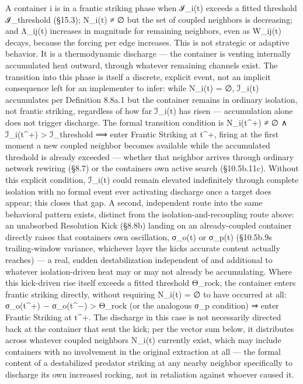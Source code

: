 \documentclass[
]{article}
\begin{document}
A container i is in a frantic striking phase when ℐ\_i(t) exceeds a
fitted threshold ℐ\_threshold (§15.3); N\_i(t) ≠ ∅ but the set of
coupled neighbors is decreasing; and Λ\_ij(t) increases in magnitude for
remaining neighbors, even as W\_ij(t) decays, because the forcing per
edge increases. This is not strategic or adaptive behavior. It is a
thermodynamic discharge --- the container is venting internally
accumulated heat outward, through whatever remaining channels exist. The
transition into this phase is itself a discrete, explicit event, not an
implicit consequence left for an implementer to infer: while N\_i(t) =
∅, ℐ\_i(t) accumulates per Definition 8.8a.1 but the container remains
in ordinary isolation, not frantic striking, regardless of how far
ℐ\_i(t) has risen --- accumulation alone does not trigger discharge. The
formal transition condition is N\_i(t\^{}+) ≠ ∅ ∧ ℐ\_i(t\^{}+)
\textgreater{} ℐ\_threshold ⟹ enter Frantic Striking at t\^{}+, firing
at the first moment a new coupled neighbor becomes available while the
accumulated threshold is already exceeded --- whether that neighbor
arrives through ordinary network rewiring (§8.7) or the
container\textquotesingle s own active search (§10.5b.11c). Without this
explicit condition, ℐ\_i(t) could remain elevated indefinitely through
complete isolation with no formal event ever activating discharge once a
target does appear; this closes that gap. A second, independent route
into the same behavioral pattern exists, distinct from the
isolation-and-recoupling route above: an unabsorbed Resolution Kick
(§8.8b) landing on an already-coupled container directly raises that
container\textquotesingle s own oscillation, σ\_o(t) or σ\_p(t)
(§10.5b.9\textquotesingle s trailing-window variance, whichever layer
the kick\textquotesingle s accurate content actually reaches) --- a
real, sudden destabilization independent of and additional to whatever
isolation-driven heat may or may not already be accumulating. Where this
kick-driven rise itself exceeds a fitted threshold Θ\_rock, the
container enters frantic striking directly, without requiring N\_i(t) =
∅ to have occurred at all: σ\_o(t\^{}+) − σ\_o(t\^{}−) \textgreater{}
Θ\_rock (or the analogous σ\_p condition) ⇒ enter Frantic Striking at
t\^{}+. The discharge in this case is not necessarily directed back at
the container that sent the kick; per the vector sum below, it
distributes across whatever coupled neighbors N\_i(t) currently exist,
which may include containers with no involvement in the original
extraction at all --- the formal content of a destabilized predator
striking at any nearby neighbor specifically to discharge its own
increased rocking, not in retaliation against whoever caused it.
\end{document}
